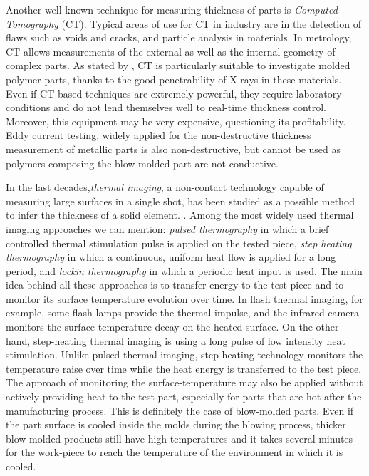 Another well-known technique for measuring thickness of parts is \textit{Computed Tomography} (CT). Typical areas of use for CT in industry are in the detection of flaws such as voids and cracks, and particle analysis in materials. In metrology, CT allows measurements of the external as well as the internal geometry of complex parts. As stated by \citet{de2014industrial}, CT is particularly suitable to investigate molded polymer parts, thanks to the good penetrability of X-rays in these materials. Even if CT-based techniques are extremely powerful, they require laboratory conditions and  do not lend themselves well to real-time thickness control. Moreover, this equipment may be very expensive, questioning its profitability.
%
Eddy current testing, widely applied for the non-destructive thickness measurement of metallic parts \citep{cheng2017thickness,mao2016thickness,wang2015noncontact,yin2007thickness}  is also non-destructive, but cannot be used as polymers composing the blow-molded part are not conductive.

In the last decades,\textit{thermal imaging}, a non-contact technology capable of measuring large surfaces in a single shot, has been studied as a possible method to infer the thickness of a solid element. \citep{sun2003method,sun2006analysis,choi2008quantitative,benitez2008definition,zeng2012absolute,li2018thickness,he2013eddy}. Among the most widely used thermal imaging approaches we can mention: \textit{pulsed thermography} in which a brief controlled thermal stimulation pulse is applied on the tested piece, \textit{step heating thermography} in which a continuous, uniform heat flow is applied for a long period, and \textit{lockin thermography} in which a periodic heat input is used. The main idea behind all these approaches is to transfer energy to the test piece and to monitor its surface temperature evolution over time. In flash thermal imaging, for example, some flash lamps provide the thermal impulse, and the infrared camera monitors the surface-temperature decay on the heated surface. On the other hand, step-heating thermal imaging is using a long pulse of low intensity heat stimulation. Unlike pulsed thermal imaging, step-heating technology monitors the temperature raise over time while the heat energy is transferred to the test piece.
The approach of monitoring the surface-temperature may also be applied without actively providing heat to the test part, especially for parts that are hot after the manufacturing process. This is definitely the case of blow-molded parts. Even if the part surface is cooled inside the molds during the blowing process, thicker blow-molded products still have high temperatures and it takes several minutes for the work-piece to reach the temperature of the environment in which it is cooled.

